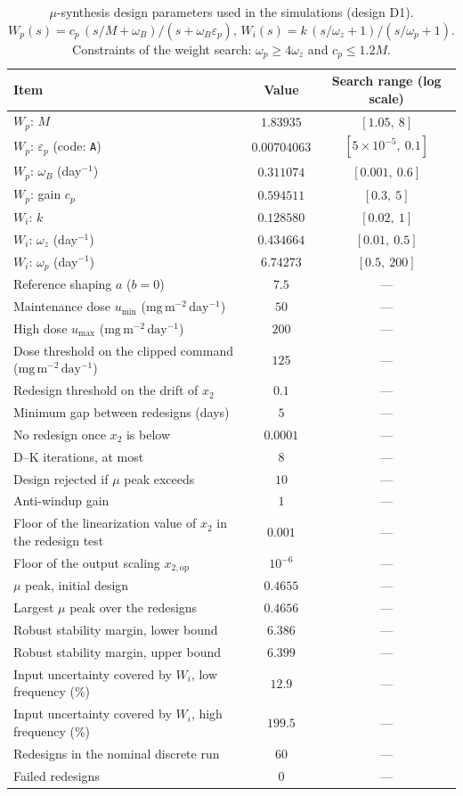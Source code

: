 \begin{table}[htbp]
\centering
\caption{$\mu$-synthesis design parameters used in the simulations (design D1). $W_p(s)=c_p\,(s/M+\omega_B)/(s+\omega_B\varepsilon_p)$, $W_i(s)=k\,(s/\omega_z+1)/(s/\omega_p+1)$. Constraints of the weight search: $\omega_p\ge4\omega_z$ and $c_p\le1.2M$.}
\label{tab:mu-params}
\small
\begin{tabular}{lcc}
\toprule
Item & Value & Search range (log scale) \\
\midrule
$W_p$: $M$ & $1.83935$ & $[1.05,\ 8]$ \\
$W_p$: $\varepsilon_p$ (code: \texttt{A}) & $0.00704063$ & $[5{\times}10^{-5},\ 0.1]$ \\
$W_p$: $\omega_B$ (day$^{-1}$) & $0.311074$ & $[0.001,\ 0.6]$ \\
$W_p$: gain $c_p$ & $0.594511$ & $[0.3,\ 5]$ \\
$W_i$: $k$ & $0.128580$ & $[0.02,\ 1]$ \\
$W_i$: $\omega_z$ (day$^{-1}$) & $0.434664$ & $[0.01,\ 0.5]$ \\
$W_i$: $\omega_p$ (day$^{-1}$) & $6.74273$ & $[0.5,\ 200]$ \\
\midrule
Reference shaping $a$ ($b=0$) & $7.5$ & --- \\
Maintenance dose $u_{\min}$ ($\mathrm{mg\,m^{-2}\,day^{-1}}$) & $50$ & --- \\
High dose $u_{\max}$ ($\mathrm{mg\,m^{-2}\,day^{-1}}$) & $200$ & --- \\
Dose threshold on the clipped command ($\mathrm{mg\,m^{-2}\,day^{-1}}$) & $125$ & --- \\
Redesign threshold on the drift of $x_2$ & $0.1$ & --- \\
Minimum gap between redesigns (days) & $5$ & --- \\
No redesign once $x_2$ is below & $0.0001$ & --- \\
D--K iterations, at most & $8$ & --- \\
Design rejected if $\mu$ peak exceeds & $10$ & --- \\
Anti-windup gain & $1$ & --- \\
Floor of the linearization value of $x_2$ in the redesign test & $0.001$ & --- \\
Floor of the output scaling $x_{2,\mathrm{op}}$ & $10^{-6}$ & --- \\
\midrule
$\mu$ peak, initial design & $0.4655$ & --- \\
Largest $\mu$ peak over the redesigns & $0.4656$ & --- \\
Robust stability margin, lower bound & $6.386$ & --- \\
Robust stability margin, upper bound & $6.399$ & --- \\
Input uncertainty covered by $W_i$, low frequency (\%) & $12.9$ & --- \\
Input uncertainty covered by $W_i$, high frequency (\%) & $199.5$ & --- \\
Redesigns in the nominal discrete run & $60$ & --- \\
Failed redesigns & $0$ & --- \\
\bottomrule
\end{tabular}
\end{table}
